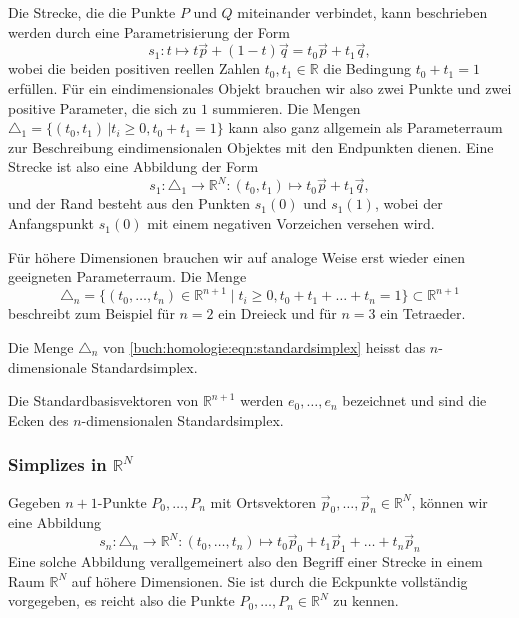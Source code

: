 Die Strecke, die die Punkte $P$ und $Q$ miteinander verbindet,
kann beschrieben werden durch eine Parametrisierung
der Form
\begin{equation}
s_1
\colon
t
\mapsto
t\vec{p} + (1-t) \vec{q}
=
t_0 \vec{p} + t_1\vec{q},
\end{equation}
wobei die beiden positiven reellen Zahlen $t_0,t_1\in\mathbb{R}$ die
Bedingung $t_0 + t_1 = 1$ erfüllen.
Für ein eindimensionales Objekt brauchen wir also zwei Punkte und zwei
positive Parameter, die sich zu $1$ summieren.
Die Mengen $\triangle_1=\{ (t_0,t_1)\,|t_i\ge 0, t_0+t_1=1\}$ kann also
ganz allgemein als Parameterraum zur Beschreibung eindimensionalen Objektes
mit den Endpunkten dienen.
Eine Strecke ist also eine Abbildung der Form
\begin{equation}
s_1
\colon
\triangle_1 \to \mathbb{R}^N
:
(t_0,t_1)
\mapsto
t_0 \vec{p} + t_1\vec{q},
\end{equation}
und der Rand besteht aus den Punkten $s_1(0)$ und $s_1(1)$, wobei der
Anfangspunkt $s_1(0)$ mit einem negativen Vorzeichen versehen wird.

Für höhere Dimensionen brauchen wir auf analoge Weise erst wieder einen
geeigneten Parameterraum.
Die Menge
\begin{equation}
\triangle_n
=
\{(t_0,\dots,t_n)\in\mathbb{R}^{n+1}\mid t_i\ge 0,t_0+t_1+\dots+t_n=1\}
\subset\mathbb{R}^{n+1}
\label{buch:homologie:eqn:standardsimplex}
\end{equation}
beschreibt zum Beispiel für $n=2$ ein Dreieck und für $n=3$ ein 
Tetraeder.
%

\begin{definition}
Die Menge $\triangle_n$ von \eqref{buch:homologie:eqn:standardsimplex}
heisst das $n$-dimensionale Standardsimplex.
%
\end{definition}

Die Standardbasisvektoren von  $\mathbb{R}^{n+1}$ werden $e_0,\dots,e_n$
bezeichnet und sind die Ecken des $n$-dimensionalen Standardsimplex.

\subsubsection{Simplizes in $\mathbb{R}^N$}
Gegeben $n+1$-Punkte $P_0,\dots,P_n$ mit Ortsvektoren
$\vec{p}_0,\dots,\vec{p}_n\in\mathbb{R}^N$, können wir eine Abbildung
\begin{equation}
s_n
\colon
\triangle_n
\to
\mathbb{R}^N
:
(t_0,\dots,t_n)
\mapsto
t_0\vec{p}_0
+
t_1\vec{p}_1
+
\dots
+
t_n\vec{p}_n
\end{equation}
Eine solche Abbildung verallgemeinert also den Begriff einer Strecke
in einem Raum $\mathbb{R}^N$  
auf höhere Dimensionen.
Sie ist durch die Eckpunkte vollständig vorgegeben, es reicht also
die Punkte $P_0,\dots,P_n\in\mathbb{R}^N$ zu kennen.

